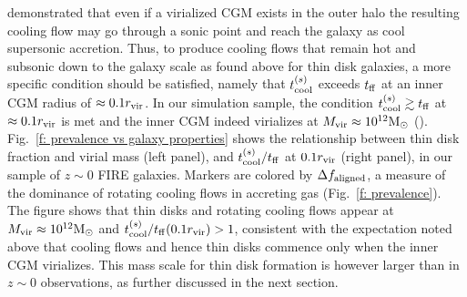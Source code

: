 \documentclass[fleqn,usenatbib]{mnras}
\newcommand{\Rvir}{r_{\rm vir}}
\newcommand{\msun}{{\rm M}_\odot}
\begin{document}
\cite{Stern2020} demonstrated that even if a virialized CGM exists in the outer halo
the resulting cooling flow may go through a sonic point and reach the galaxy as cool supersonic accretion.
Thus, to produce cooling flows that remain hot and subsonic down to the galaxy scale as found above for thin disk galaxies, a more specific condition should be satisfied, namely that $t_{\rm cool}^{(s)}$ exceeds $t_{\rm ff}$ at an inner CGM radius of $\approx0.1 r_{\rm vir}$.
In our simulation sample, the condition $t_{\rm cool}^{(s)}\gtrsim t_{\rm ff}$ at $\approx0.1 r_{\rm vir}$ is met and the inner CGM indeed virializes at $\Mvir\approx10^{12}\msun$ (\citealt{Stern2021}). 
Fig.~\ref{f: prevalence vs galaxy properties} shows the relationship between thin disk fraction and virial mass (left panel), and $t_{\rm cool}^{(s)}/t_{\rm ff}$ at $0.1 r_{\rm vir}$ (right panel), in our sample of $z\sim0$ FIRE galaxies.
Markers are colored by $\Delta f_{\rm aligned}$, a measure of the dominance of rotating cooling flows in accreting gas (Fig.~\ref{f: prevalence}).
The figure shows that thin disks and rotating cooling flows appear at $M_{\rm vir}\approx 10^{12}\msun$ and $\tcoolsh/\tff(0.1\Rvir)>1$, consistent with the expectation noted above that cooling flows and hence thin disks commence only when the inner CGM virializes.
This mass scale for thin disk formation is however larger than in $z\sim0$ observations, as further discussed in the next section.
\end{document}
